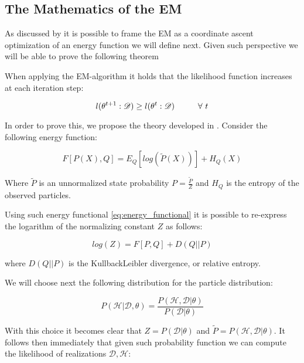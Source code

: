 \documentclass[11pt]{article}
\begin{document}
\begin{article}
\subsection{The Mathematics of the EM}
\label{math_em}
As discussed by \cite{koller2009probabilistic} it is possible to frame
the EM as a coordinate ascent optimization of an energy function we
will define next. Given such perspective we will be able to prove the
following theorem

\begin{theorem}\label{thm:one}
When applying the EM-algorithm it holds that the likelihood function increases at each iteration step:

$$l(\theta^{t+1} : \mathscr{D}) \geq l(\theta^{t} : \mathscr{D}) \hspace*{1cm} \forall \ t$$
\end{theorem}

In order to prove this, we propose the theory developed in
\cite{koller2009probabilistic}. Consider the following energy
function:

\begin{equation} \label{eq:energy_functional}
F[P(X), Q] = E_Q[log (\tilde{P}(X))] + H_Q (X)
\end{equation}

Where \(\tilde{P}\) is an unnormalized state probability \(P =
   \frac{\tilde{P}}{Z}\) and \(H_Q\) is the entropy of the observed
particles. 

Using such energy functional \ref{eq:energy_functional} it is possible
to re-express the logarithm of the normalizing constant \(Z\) as
follows:

\begin{equation} \label{eq:energy_refurmolation}
log (Z) = F[P, Q] + D (Q||P)
\end{equation}

where $D(Q||P)$ is the Kullback\textendash Leibler divergence, or relative
entropy.

We will choose next the following distribution for the particle
distribution:

\begin{equation} \label{eq:particle_distribution}
P (\mathscr{H} | \mathscr{D}, \theta) =   \frac{P (\mathscr{H}, \mathscr{D}| \theta)}{P (\mathscr{D}| \theta)}
\end{equation}

With this choice it becomes clear that \(Z = P (\mathscr{D}|
   \theta)\) and \(\tilde{P} = P (\mathscr{H}, \mathscr{D}| \theta)\). It
follows then immediately that given such probability function we
can compute the likelihood of realizations \(\mathscr{D}, \mathscr{H}\):


\end{article}
\end{document}
